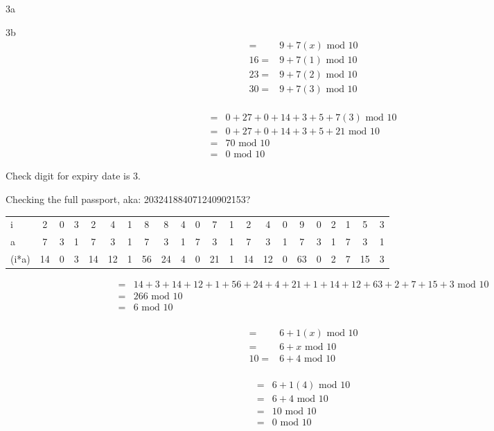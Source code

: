 \begin{question}{3a}
\begin{question}{3b}
\begin{align*}
=& 9 + 7(x)\textrm{ mod } 10\\
16=& 9 + 7(1)\textrm{ mod } 10\\
23=& 9 + 7(2)\textrm{ mod } 10\\
30=& 9 + 7(3)\textrm{ mod } 10\\
\end{align*}

\begin{align*}
=& 0  + 27 + 0  + 14 + 3  + 5 +7(3) \textrm{ mod } 10\\
=& 0  + 27 + 0  + 14 + 3  + 5 + 21 \textrm{ mod } 10\\
=& 70 \textrm{ mod } 10\\
=& 0 \textrm{ mod } 10
\end{align*}

Check digit for expiry date is 3.



Checking the full passport, aka: 203241884071240902153?

\begin{tabular}{l|ccccccccccccccccccccc}
\hline
i     &  2  & 0  & 3  & 2  & 4  & 1  & 8  & 8  & 4  & 0  & 7  & 1  & 2  & 4  & 0  & 9  & 0  & 2  & 1  & 5  & 3 \\
a     & 7   & 3  & 1  & 7  & 3  & 1  & 7  & 3  & 1  & 7  & 3  & 1  & 7  & 3  & 1  & 7  & 3  & 1  & 7  & 3  & 1 \\
\hline
(i*a) & 14 & 0 & 3  & 14  & 12 & 1  & 56 & 24 & 4  & 0  & 21 & 1  & 14 & 12 & 0  & 63 & 0  & 2  & 7  & 15 & 3
\end{tabular}

\begin{align*}
=& 14  + 3   + 14   + 12  + 1   + 56  + 24  + 4   + 21  + 1   + 14  + 12  + 63  + 2   + 7   + 15  + 3 \textrm{ mod } 10\\
=& 266 \textrm{ mod } 10\\
=& 6 \textrm{ mod } 10\\
\end{align*}

\begin{align*}
=& 6 + 1(x)\textrm{ mod } 10\\
=& 6 + x\textrm{ mod } 10\\
10=& 6 + 4\textrm{ mod } 10\\
\end{align*}

\begin{align*}
=& 6 +1(4) \textrm{ mod } 10\\
=& 6 +4    \textrm{ mod } 10\\
=& 10 \textrm{ mod } 10\\
=& 0 \textrm{ mod } 10
\end{align*}


\end{question}
\end{question}
